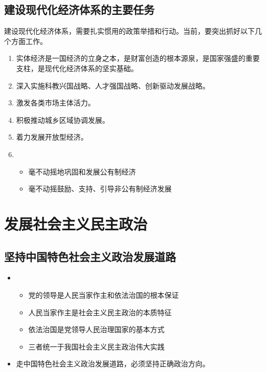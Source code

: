     \subsection{建设现代化经济体系的主要任务}
        建设现代化经济体系，需要扎实惯用的政策举措和行动。当前，要突出抓好以下几个方面工作。
        \begin{enumerate}
            \item {}实体经济是一国经济的立身之本，是财富创造的根本源泉，是国家强盛的重要支柱，是现代化经济体系的坚实基础。
            \item {}深入实施科教兴国战略、人才强国战略、创新驱动发展战略。
            \item 激发各类市场主体活力。
            \item 积极推动城乡区域协调发展。
            \item 着力发展开放型经济。
            \item {}
            \begin{itemize}
                \item 毫不动摇地巩固和发展公有制经济
                \item 毫不动摇鼓励、支持、引导非公有制经济发展
            \end{itemize}
        \end{enumerate}


\section{发展社会主义民主政治}
    \subsection{坚持中国特色社会主义政治发展道路}
        \begin{itemize}
            \item {}
            \begin{itemize}
                \item 党的领导是人民当家作主和依法治国的根本保证
                \item 人民当家作主是社会主义民主政治的本质特征
                \item 依法治国是党领导人民治理国家的基本方式
                \item 三者统一于我国社会主义民主政治伟大实践
            \end{itemize}
            \item 走中国特色社会主义政治发展道路，必须坚持正确政治方向。
        \end{itemize}

